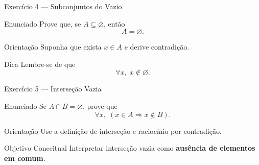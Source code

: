 \documentclass[9pt]{beamer}
\begin{document}
\begin{frame}{Exercício 4 — Subconjuntos do Vazio}

\begin{block}{Enunciado}
Prove que, se $A \subseteq \varnothing$, então
\[
A = \varnothing.
\]
\end{block}

\begin{block}{Orientação}
Suponha que exista $x \in A$ e derive contradição.
\end{block}

\begin{block}{Dica}
Lembre-se de que
\[
\forall x,\; x \notin \varnothing.
\]
\end{block}

\end{frame}\begin{frame}{Exercício 5 — Interseção Vazia}

\begin{block}{Enunciado}
Se $A \cap B = \varnothing$, prove que
\[
\forall x,\; (x \in A \Rightarrow x \notin B).
\]
\end{block}

\begin{block}{Orientação}
Use a definição de interseção e raciocínio por contradição.
\end{block}

\begin{block}{Objetivo Conceitual}
Interpretar interseção vazia como
\textbf{ausência de elementos em comum}.
\end{block}

\end{frame}
\end{document}
